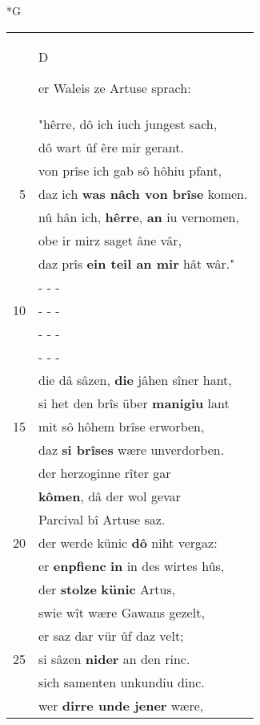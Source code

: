 \documentclass[8pt,a4paper,notitlepage]{article}
\begin{document}
\begin{table}[ht]
\begin{minipage}[t]{0.5\linewidth}
\small
\begin{center}*G
\end{center}
\begin{tabular}{rl}
 & \begin{large}D\end{large}er Waleis ze Artuse sprach:\\ 
 & "hêrre, dô ich iuch jungest sach,\\ 
 & dô wart ûf êre mir gerant.\\ 
 & von prîse ich gab sô hôhiu pfant,\\ 
5 & daz ich \textbf{was nâch von brîse} komen.\\ 
 & nû hân ich, \textbf{hêrre}, \textbf{an} iu vernomen,\\ 
 & obe ir mirz saget âne vâr,\\ 
 & daz prîs \textbf{ein teil an mir} hât wâr."\\ 
 & \multicolumn{1}{l}{ - - - }\\ 
10 & \multicolumn{1}{l}{ - - - }\\ 
 & \multicolumn{1}{l}{ - - - }\\ 
 & \multicolumn{1}{l}{ - - - }\\ 
 & die dâ sâzen, \textbf{die} jâhen sîner hant,\\ 
 & si het den brîs über \textbf{manigiu} lant\\ 
15 & mit sô hôhem brîse erworben,\\ 
 & daz \textbf{si brîses} wære unverdorben.\\ 
 & der herzoginne rîter gar\\ 
 & \textbf{kômen}, dâ der wol gevar\\ 
 & Parcival bî Artuse saz.\\ 
20 & der werde künic \textbf{dô} niht vergaz:\\ 
 & er \textbf{enpfienc} \textbf{in} in des wirtes hûs,\\ 
 & der \textbf{stolze} \textbf{künic} Artus,\\ 
 & swie wît wære Gawans gezelt,\\ 
 & er saz dar vür ûf daz velt;\\ 
25 & si sâzen \textbf{nider} an den rinc.\\ 
 & sich samenten unkundiu dinc.\\ 
 & wer \textbf{dirre unde jener} wære,\\ 

\end{tabular}
\end{minipage}
\end{table}
\end{document}
